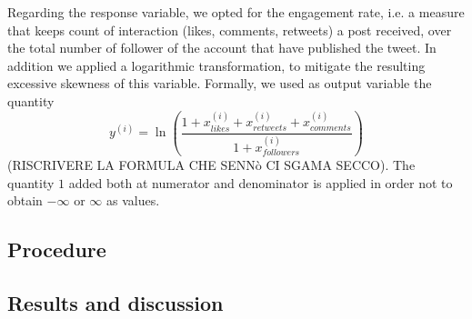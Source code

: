 \documentclass{article}
\begin{document}
Regarding the response variable, we opted for the engagement rate, i.e. a measure that keeps count of interaction (likes, comments, retweets) a post received, over the total number of follower of the account that have published the tweet. In addition we applied a logarithmic transformation, to mitigate the resulting excessive skewness of this variable.
Formally, we used as output variable the quantity $$y^{(i)} = \ln \left( \frac{1+x^{(i)}_{likes}+x^{(i)}_{retweets}+x^{(i)}_{comments}}{1+x^{(i)}_{followers}} \right)$$ (RISCRIVERE LA FORMULA CHE SENNò CI SGAMA SECCO).
The quantity $1$ added both at numerator and denominator is applied in order not to obtain $-\infty$ or $\infty$ as values.

\subsection{Procedure}

\subsection{Results and discussion}



\end{document}
